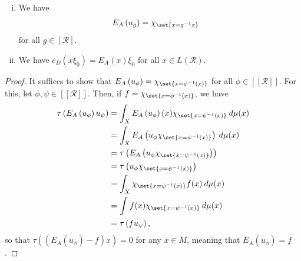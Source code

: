 \documentclass[10pt]{mypackage}
\begin{document}
\begin{proposition}\hfill
  \begin{enumerate}[(i)]
    \item We have
    \begin{align*}
      E_A\left( u_{g} \right) &= \chi_{\set{x = g^{-1}x}}
    \end{align*}
    for all $g\in \left[ \mathcal{R} \right]$.
    \item We have $e_D\left( x\xi_0 \right) = E_A(x)\xi_0$ for all $x\in L\left( \mathcal{R} \right)$.
  \end{enumerate}
\end{proposition}
\begin{proof}
  It suffices to show that $E_A\left( u_{\phi} \right) = \chi_{\set{x = \phi^{-1}(x)}}$ for all $\phi\in \left[ \left[ \mathcal{R} \right] \right]$. For this, let $\phi,\psi\in \left[ \left[ \mathcal{R} \right] \right]$. Then, if $f = \chi_{\set{x = \phi^{-1}(x)}}$, we have
  \begin{align*}
    \tau\left( E_A\left( u_{\phi} \right)u_{\psi} \right) &= \int_{X}^{} E_A\left( u_{\phi} \right)(x)\chi_{\set{x = \psi^{-1}(x)}}\:d\mu(x)\\
                                                          &= \int_{X}^{} E_A\left( u_{\phi}\chi_{\set{x = \psi^{-1}(x)}} \right)\:d\mu(x)\\
                                                          &= \tau\left( E_A\left( u_{\phi}\chi_{\set{x = \psi^{-1}(x)}} \right) \right)\\
                                                          &= \tau\left( u_{\phi}\chi_{\set{x = \psi^{-1}(x)}} \right)\\
                                                          &= \int_{X}^{} \chi_{\set{x = \psi^{-1}(x)}}f(x)\:d\mu(x)\\
                                                          &= \int_{}^{} f(x)\chi_{\set{x = \psi^{-1}(x)}}\:d\mu(x)\\
                                                          &= \tau\left( fu_{\psi} \right),
  \end{align*}
  so that $\tau\left( \left( E_A\left( u_{\phi} \right)-f \right)x \right) = 0$ for any $x\in M$, meaning that $E_{A}\left( u_{\phi} \right) = f$.
\end{proof}
\nocite{takesaki_1,takesaki_2,von_neumann_algebras_peterson,ii1_factors_houdayer}
\printbibliography
\end{document}
